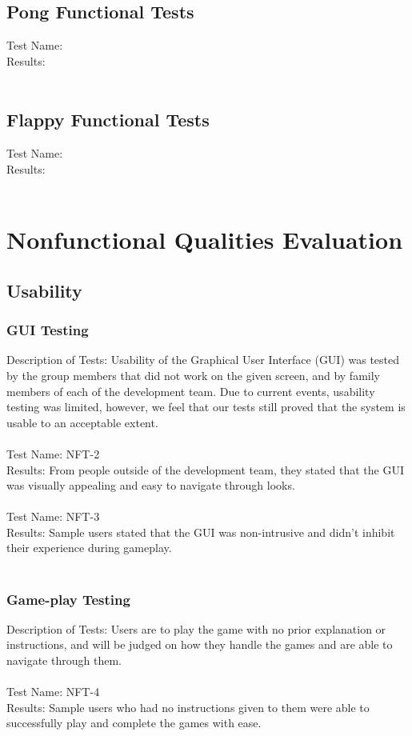 \documentclass[12pt, titlepage]{article}
\begin{document}
\subsection{Pong Functional Tests}
	Test Name: \\
	Results: \\ \\
	
\subsection{Flappy Functional Tests}
	Test Name: \\
	Results: \\ \\
	
\section{Nonfunctional Qualities Evaluation} 

	\subsection{Usability}
	
	\subsubsection{GUI Testing}
	Description of Tests: Usability of the Graphical User Interface (GUI) was tested by the group members that did not work on the given screen, and by family members of each of the development team. Due to current events, usability testing was limited, however, we feel that our tests still proved that the system is usable to an acceptable extent.\\ \\
	Test Name: NFT-2\\
	Results: From people outside of the development team, they stated that the GUI was visually appealing and easy to navigate through looks.\\ \\
	Test Name: NFT-3\\
	Results: Sample users stated that the GUI was non-intrusive and didn't inhibit their experience during gameplay. \\ \\
	
	\subsubsection{Game-play Testing}
	Description of Tests: Users are to play the game with no prior explanation or instructions, and will be judged on how they handle the games and are able to navigate through them. \\ \\
	Test Name: NFT-4 \\ 
	Results: Sample users who had no instructions given to them were able to successfully play and complete the games with ease. \\ \\
	
\end{document}
